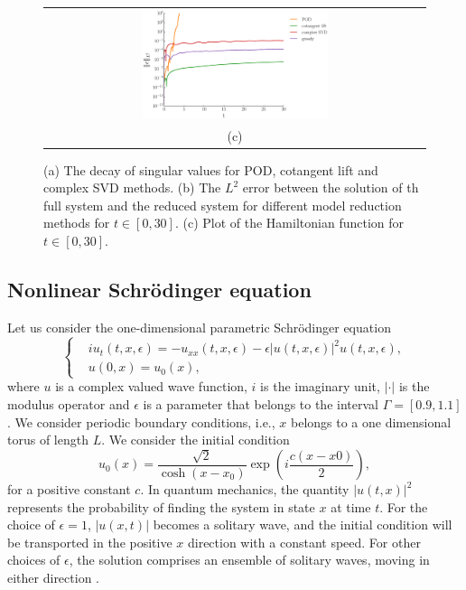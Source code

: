 \begin{figure}[t] 
\begin{center}
\begin{tabular}{c}
	\includegraphics[width=0.5\textwidth]{./figs/wave/error} \\
	(c)
\end{tabular}
\end{center}
\caption{(a) The decay of singular values for POD, cotangent lift and complex SVD methods. (b) The $L^2$ error between the solution of th full system and the reduced system for different model reduction methods for $t \in [0,30]$. (c) Plot of the Hamiltonian function for $t \in [0,30]$.}\label{fig:NuRe:4}
\end{figure}








\subsection{Nonlinear Schr\"odinger equation} Let us consider the one-dimensional parametric Schr\"odinger equation
\begin{equation} \label{eq:NuRe:10}
\left\{
\begin{aligned}
	& i u_t(t,x,\epsilon) = - u_{xx}(t,x,\epsilon) - \epsilon |u(t,x,\epsilon)|^2 u(t,x,\epsilon),\\
	& u(0,x) = u_0(x),
\end{aligned}
\right.
\end{equation}
where $u$ is a complex valued wave function, $i$ is the imaginary unit, $|\cdot|$ is the modulus operator and $\epsilon$ is a parameter that belongs to the interval $\Gamma = [0.9,1.1]$. We consider periodic boundary conditions, i.e., $x$ belongs to a one dimensional torus of length $L$. We consider the initial condition
\begin{equation} \label{eq:NuRe:11}
	u_0(x) = \frac{\sqrt 2}{\cosh(x - x_0)} \exp(i\frac{c(x-x0)}{2}),
\end{equation}
for a positive constant $c$. In quantum mechanics, the quantity $|u(t,x)|^2$ represents the probability of finding the system in state $x$ at time $t$. For the choice of $\epsilon = 1$, $|u(x,t)|$ becomes a solitary wave, and the initial condition will be transported in the positive $x$ direction with a constant speed. For other choices of $\epsilon$, the solution comprises an ensemble of solitary waves, moving in either direction \cite{Faou:2012vh}. 

